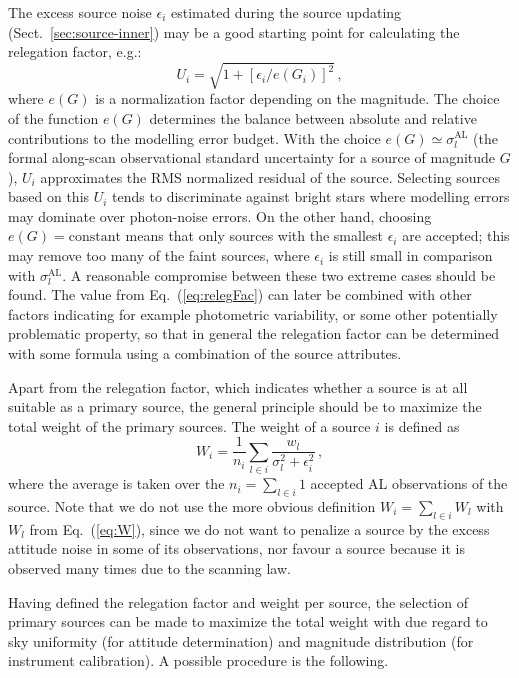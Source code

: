 \documentclass[structabstract]{aa}
\begin{document}
The excess source noise $\epsilon_i$ estimated during the source
updating (Sect.~\ref{sec:source-inner}) may be a good starting point 
for calculating the relegation factor, e.g.:
\begin{equation}\label{eq:relegFac}
U_i = \sqrt{1 + \left[\epsilon_i / e(G_i)\right]^2} \, ,
\end{equation}
where $e(G)$ is a normalization factor depending on the magnitude.
The choice of the function $e(G)$ determines the balance between
absolute and relative contributions to the modelling error budget.
With the choice $e(G)\simeq\sigma_l^\text{AL}$ (the formal along-scan observational 
standard uncertainty for a source of magnitude $G$), $U_i$ approximates
the RMS normalized residual of the source. Selecting sources based
on this $U_i$ tends to discriminate against bright stars where
modelling errors may dominate over photon-noise errors. 
On the other hand, choosing $e(G)=\text{constant}$ means that
only sources with the smallest $\epsilon_i$ are accepted; this
may remove too many of the faint sources, where $\epsilon_i$
is still small in comparison with $\sigma_l^\text{AL}$. A reasonable compromise
between these two extreme cases should be found.
The value from Eq.~(\ref{eq:relegFac}) can later be combined
with other factors indicating for example photometric variability, or 
some other potentially problematic property, so that in general the 
relegation factor can be determined with some formula using a 
combination of the source attributes.

Apart from the relegation factor, which indicates whether a source is at
all suitable as a primary source, the general principle should be to 
maximize the total weight of the primary sources. The weight of a
source $i$ is defined as
\begin{equation}\label{eq:Wi}
W_i= \frac{1}{n_i}\sum_{l\in i} \frac{w_l}{\sigma_l^2 + \epsilon_i^2} \, ,
\end{equation}
where the average is taken over the $n_i=\sum_{l\in i}1$ accepted 
AL observations of the source.
Note that we do not use the more obvious definition
$W_i=\sum_{l\in i}W_l$ with $W_l$ from Eq.~(\ref{eq:W}), since we
do not want to penalize a source by the excess attitude noise in some
of its observations, nor favour a source because it is observed many 
times due to the scanning law.

Having defined the relegation factor and weight per source, the selection 
of primary sources can be made to maximize the total weight with due 
regard to sky uniformity (for attitude determination) and magnitude 
distribution (for instrument calibration). A possible procedure is
the following.
\end{document}

